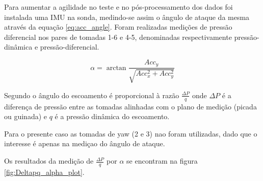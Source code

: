 Para aumentar a agilidade no teste e no pós-processamento dos dados foi instalada uma IMU na sonda, medindo-se assim o ângulo de ataque da mesma através da equação \ref{eq:acc_angle}. Foram realizadas medições de pressão diferencial nos pares de tomadas 1-6 e 4-5, denominadas respectivamente pressão-dinâmica e pressão-diferencial.

\begin{equation}
    \alpha = \arctan \frac{Acc_y}{\sqrt{Acc_x^2+Acc_y^2}}   
    \label{eq:acc_angle}
\end{equation}


Segundo \cite{borges2008desenvolvimento} o ângulo do escoamento é proporcional à razão $\frac{\Delta P}{q}$ onde $\Delta P$ é a diferença de pressão entre as tomadas alinhadas com o plano de medição (picada ou guinada) e $q$ é a pressão dinâmica do escoamento.



Para o presente caso as tomadas de yaw (2 e 3) nao foram utilizadas, dado que o interesse é apenas na mediçao do ângulo de ataque.


Os resultados da medição de $\frac{\Delta P}{q}$ por $\alpha$ se encontram na figura \ref{fig:Deltapq_alpha_plot}.

